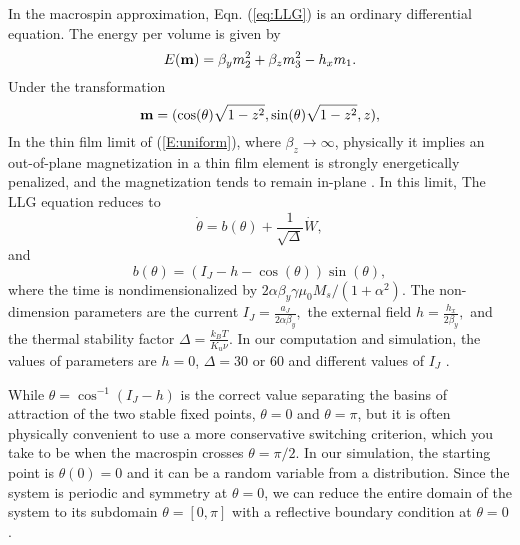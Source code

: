 \documentclass[journal,transmag]{IEEEtran}
\begin{document}
In the macrospin approximation, Eqn. (\ref{eq:LLG}) is an ordinary differential equation. The energy per volume is given by 
%
\begin{equation} \label{E:uniform}
E({\bf{m}}) =  \beta_y m_2^2+\beta_z m_3^2- h_x m_1.
\end{equation}
%
Under the transformation
%  
\begin{equation}
{\bf{m}} = (\cos(\theta) \sqrt{1-z^2}, \sin(\theta) \sqrt{1-z^2},z), 
\end{equation}
%
In the thin film limit of (\ref{E:uniform}), where $\beta_z \rightarrow \infty$, physically it implies  an out-of-plane magnetization in a thin film element is strongly energetically penalized, and the magnetization tends to remain in-plane \cite{Kohn2005}. In this limit, The LLG equation reduces to 
\begin{equation}  \label{sys:macro}
 \dot{\theta} = b(\theta)+ \frac{1}{ \sqrt{\Delta}} \dot{W},
\end{equation}
and  
\begin{equation} 
b(\theta) = (I_J-h -\cos(\theta))\sin(\theta), 
\end{equation}
 where the time is nondimensionalized by $2\alpha \beta_y \gamma \mu_0 M_s/(1+\alpha^2).$   %
The non-dimension parameters are the current $ I_J= \frac{a_J}{2 \alpha \beta_y},$ the external field $h = \frac{h_x}{2 \beta_y},$ and the thermal stability factor $ \Delta = \frac{k_B T}{K_u \nu}.$ In our computation and simulation,  the values of parameters are $h = 0$,  $ \Delta=30$ or $60$ and different values of $I_J$ \cite{6242414}.

While $ \theta =\cos^{-1}(I_J-h)$  is the correct value separating the basins of attraction of the two stable fixed points, $\theta = 0$ and $\theta = \pi$, but it is often physically convenient to use a more conservative switching criterion, which you take to be when the macrospin crosses $\theta = \pi/2.$ In our simulation, the starting point is $\theta(0) = 0$ and it can be a random variable from a distribution. Since the system is periodic and symmetry at $\theta=0$, we can reduce the entire domain of the system to its subdomain $\theta = [0,\pi]$ with a reflective boundary condition at $\theta = 0$.

\end{document}
